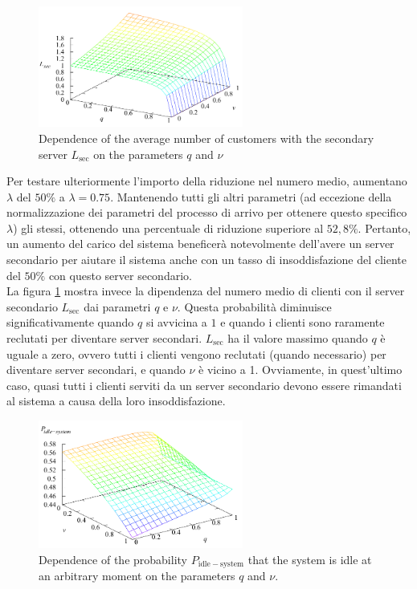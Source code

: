 \documentclass[11pt]{article}
\begin{document}
\begin{figure}[h]
    \centering
    \includegraphics[width=0.6\textwidth]{0uFWo7C.png}
    \caption{Dependence of the average number of customers with the secondary server $L_\mathrm{sec}$ on the parameters $q$ and $\nu$}
    \label{fig:7}
\end{figure}

Per testare ulteriormente l'importo della riduzione nel numero medio, aumentano $\lambda$ del $50\%$ a $\lambda = 0.75$. Mantenendo tutti gli altri parametri (ad eccezione della normalizzazione dei parametri del processo di arrivo per ottenere questo specifico $\lambda$) gli stessi, ottenendo una percentuale di riduzione superiore al $52,8\%$. Pertanto, un aumento del carico del sistema beneficerà notevolmente dell'avere un server secondario per aiutare il sistema anche con un tasso di insoddisfazione del cliente del $50\%$ con questo server secondario. \\

La figura \ref{fig:7} mostra invece la dipendenza del numero medio di clienti con il server secondario $L_\mathrm{sec}$ dai parametri $q$ e $\nu$. Questa probabilità diminuisce significativamente quando $q$ si avvicina a $1$ e quando i clienti sono raramente reclutati per diventare server secondari. $L_\mathrm{sec}$ ha il valore massimo quando $q$ è uguale a zero, ovvero tutti i clienti vengono reclutati (quando necessario) per diventare server secondari, e quando $\nu$ è vicino a 1. Ovviamente, in quest'ultimo caso, quasi tutti i clienti serviti da un server secondario devono essere rimandati al sistema a causa della loro insoddisfazione.

\begin{figure}[h!]
    \centering
    \includegraphics[width=0.6\textwidth]{3zlg6uj.png}
    \caption{Dependence of the probability $P_\mathrm{idle-system}$ that the system is idle at an arbitrary moment on the parameters $q$ and $\nu$.}
    \label{fig:8}
\end{figure}
\end{document}
